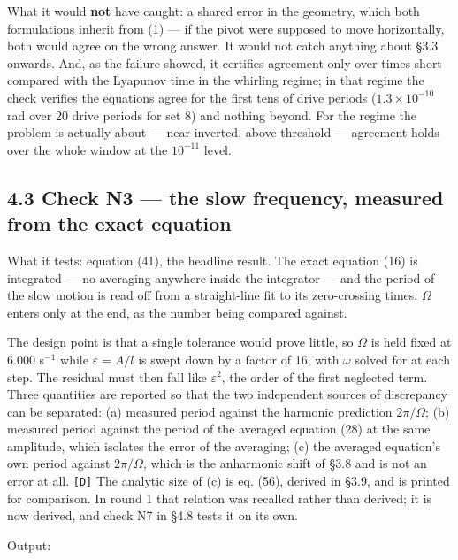 \documentclass[11pt,a4paper]{article}
\newcommand{\tagmark}[1]{\marginnote{\scriptsize\ttfamily #1}}
\newcommand{\Ntag}{\tagmark{[N]}}   %
\providecommand{\passthrough}[1]{#1}
\begin{document}
What it would \textbf{not} have caught: a shared error in the geometry, which both
formulations inherit from (1) --- if the pivot were supposed to move horizontally,
both would agree on the wrong answer. It would not catch anything about §3.3
onwards. And, as the failure showed, it certifies agreement only over times
short compared with the Lyapunov time in the whirling regime; in that regime the
check verifies the equations agree for the first tens of drive periods
(\(1.3\times10^{-10}\) rad over 20 drive periods for set 8) and nothing beyond.
For the regime the problem is actually about --- near-inverted, above threshold ---
agreement holds over the whole window at the \(10^{-11}\) level.

\hypertarget{check-n3-the-slow-frequency-measured-from-the-exact-equation}{%
\subsection{4.3 Check N3 --- the slow frequency, measured from the exact equation}\label{check-n3-the-slow-frequency-measured-from-the-exact-equation}}

\Ntag{} What it tests: equation (41), the headline result. The exact equation (16)
is integrated --- no averaging anywhere inside the integrator --- and the period of
the slow motion is read off from a straight-line fit to its zero-crossing times.
\(\Omega\) enters only at the end, as the number being compared against.

The design point is that a single tolerance would prove little, so \(\Omega\) is
held fixed at 6.000 s\(^{-1}\) while \(\varepsilon=A/l\) is swept down by a factor
of 16, with \(\omega\) solved for at each step. The residual must then fall like
\(\varepsilon^2\), the order of the first neglected term. Three quantities are
reported so that the two independent sources of discrepancy can be separated:
(a) measured period against the harmonic prediction \(2\pi/\Omega\); (b) measured
period against the period of the averaged equation (28) at the same amplitude,
which isolates the error of the averaging; (c) the averaged equation's own
period against \(2\pi/\Omega\), which is the anharmonic shift of §3.8 and is not
an error at all. \passthrough{\lstinline![D]!} The analytic size of (c) is eq. (56), derived in §3.9,
and is printed for comparison. In round 1 that relation was recalled rather than
derived; it is now derived, and check N7 in §4.8 tests it on its own.

Output:
\end{document}
